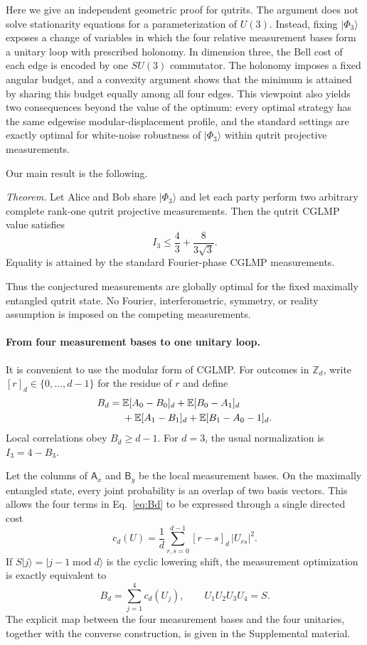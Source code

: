 \documentclass[aps,prl,reprint,superscriptaddress,nofootinbib]{revtex4-2}
\newcommand{\Z}{\mathbb{Z}}
\newcommand{\ket}[1]{\lvert #1\rangle}
\newcommand{\Phithree}{\lvert\Phi_3\rangle}
\begin{document}
Here we give an independent geometric proof for qutrits. The argument does not solve stationarity equations for a parameterization of $U(3)$. Instead, fixing $\Phithree$ exposes a change of variables in which the four relative measurement bases form a unitary loop with prescribed holonomy. In dimension three, the Bell cost of each edge is encoded by one $SU(3)$ commutator. The holonomy imposes a fixed angular budget, and a convexity argument shows that the minimum is attained by sharing this budget equally among all four edges. This viewpoint also yields two consequences beyond the value of the optimum: every optimal strategy has the same edgewise modular-displacement profile, and the standard settings are exactly optimal for white-noise robustness of $\Phithree$ within qutrit projective measurements.

Our main result is the following.

\textit{Theorem.} Let Alice and Bob share $\Phithree$ and let each party perform two arbitrary complete rank-one qutrit projective measurements. Then the qutrit CGLMP value satisfies
\begin{equation}
I_3\leq \frac{4}{3}+\frac{8}{3\sqrt3}.
\label{eq:mainI}
\end{equation}
Equality is attained by the standard Fourier-phase CGLMP measurements.

Thus the conjectured measurements are globally optimal for the fixed maximally entangled qutrit state. No Fourier, interferometric, symmetry, or reality assumption is imposed on the competing measurements.

\paragraph{From four measurement bases to one unitary loop.}
It is convenient to use the modular form of CGLMP. For outcomes in $\Z_d$, write $[r]_d\in\{0,\ldots,d-1\}$ for the residue of $r$ and define
\begin{align}
B_d={}&\mathbb E[A_0-B_0]_d+\mathbb E[B_0-A_1]_d \notag\\
&+\mathbb E[A_1-B_1]_d+\mathbb E[B_1-A_0-1]_d .
\label{eq:Bd}
\end{align}
Local correlations obey $B_d\geq d-1$. For $d=3$, the usual normalization is $I_3=4-B_3$.

Let the columns of $\mathsf A_x$ and $\mathsf B_y$ be the local measurement bases. On the maximally entangled state, every joint probability is an overlap of two basis vectors. This allows the four terms in Eq.~\eqref{eq:Bd} to be expressed through a single directed cost
\begin{equation}
c_d(U)=\frac{1}{d}\sum_{r,s=0}^{d-1}[r-s]_d\,|U_{rs}|^2.
\label{eq:cost}
\end{equation}
If $S\ket j=\ket{j-1\;\mathrm{mod}\;d}$ is the cyclic lowering shift, the measurement optimization is exactly equivalent to
\begin{equation}
B_d=\sum_{j=1}^{4}c_d(U_j),\qquad U_1U_2U_3U_4=S.
\label{eq:factor}
\end{equation}
The explicit map between the four measurement bases and the four unitaries, together with the converse construction, is given in the Supplemental material.
\end{document}

